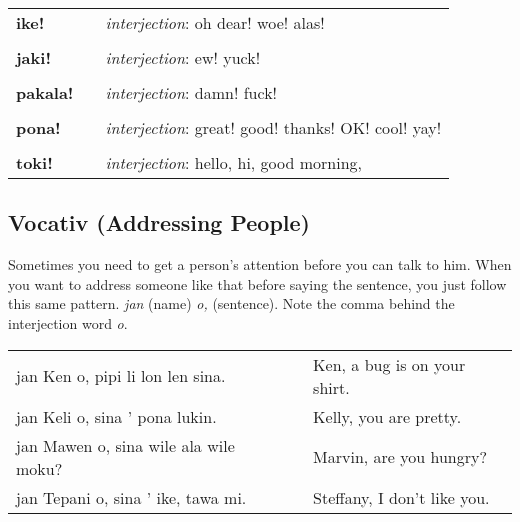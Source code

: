 \begin{supertabular}{p{2,5cm}|ll}
    \textbf{ike!}            &  & \textit{interjection}: oh dear! woe! alas!                                          \\
                             &  &                                                                                     \\
    \textbf{jaki!}           &  & \textit{interjection}: ew! yuck!                                                    \\
                             &  &                                                                                     \\
    \textbf{pakala!}         &  & \textit{interjection}: damn! fuck!                                                  \\
                             &  &                                                                                     \\
    \textbf{pona!}           &  & \textit{interjection}: great! good! thanks! OK! cool! yay!                          \\
                             &  &                                                                                     \\
    \textbf{toki!}           &  & \textit{interjection}: hello, hi, good morning,                                     \\
\end{supertabular}

\newpage

\subsection*{Vocativ (Addressing People)}
Sometimes you need to get a person's attention before you can talk to him.
When you want to address someone like that before saying the sentence, you just follow this same pattern.
\textit{jan} (name) \textit{o,} (sentence).
Note the comma behind the interjection word \textit{o}.

\begin{supertabular}{p{5,5cm}|ll}
    jan Ken o, pipi li lon len sina.      &  & Ken, a bug is on your shirt. \\
    jan Keli o, sina ' pona lukin.        &  & Kelly, you are pretty.       \\
    jan Mawen o, sina wile ala wile moku? &  & Marvin, are you hungry?      \\
    jan Tepani o, sina ' ike, tawa mi.    &  & Steffany, I don't like you.  \\
\end{supertabular}

